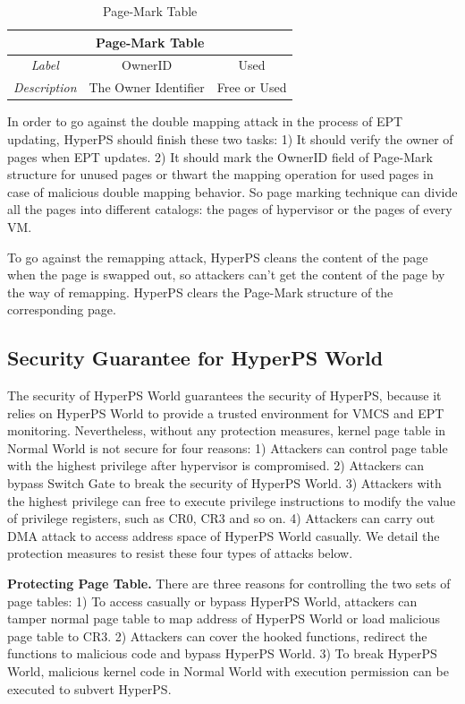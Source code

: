 \documentclass[10pt, numbers, preprint ]{sigplanconf}
\begin{document}
{%
\begin{table}[htbp]
	\centering
	\caption{Page-Mark Table}
	\label{tb2_pagemark}
	\begin{tabular}{|c|c|c|}
		\hline
		\multicolumn{3}{|c|}{\textbf{Page-Mark Table}} \\ \hline
		\textit{Label} & OwnerID & Used \\ \hline
		\textit{Description} & The Owner Identifier & Free or Used \\ \hline
	\end{tabular}
\end{table}

In order to go against the double mapping attack in the process of EPT updating, HyperPS should finish these two tasks: 1) It should verify the owner of pages when EPT updates. 2) It should mark the OwnerID field of Page-Mark structure for unused pages or thwart the mapping operation for used pages in case of malicious double mapping behavior. So page marking technique can divide all the pages into different catalogs: the pages of hypervisor or the pages of every VM.

To go against the remapping attack, HyperPS cleans the content of the page when the page is swapped out, so attackers can’t get the content of the page by the way of remapping. HyperPS clears the Page-Mark structure of the corresponding page.

\subsection{Security Guarantee for HyperPS World} \label{subsec:secugrant}
The security of HyperPS World guarantees the security of HyperPS, because it relies on HyperPS World to provide a trusted environment for VMCS and EPT monitoring. Nevertheless, without any protection measures, kernel page table in Normal World is not secure for four reasons: 1) Attackers can control page table with the highest privilege after hypervisor is compromised. 2) Attackers can bypass Switch Gate to break the security of HyperPS World. 3) Attackers with the highest privilege can free to execute privilege instructions to modify the value of privilege registers, such as CR0, CR3 and so on. 4) Attackers can carry out DMA attack to access address space of HyperPS World casually. We detail the protection measures to resist these four types of attacks below.

\textbf{Protecting Page Table.} There are three reasons for controlling the two sets of page tables: 1) To access casually or bypass HyperPS World, attackers can tamper normal page table to map address of HyperPS World or load malicious page table to CR3. 2) Attackers can cover the hooked functions, redirect the functions to malicious code and bypass HyperPS World. 3) To break HyperPS World, malicious kernel code in Normal World with execution permission can be executed to subvert HyperPS.

}
\end{document}
